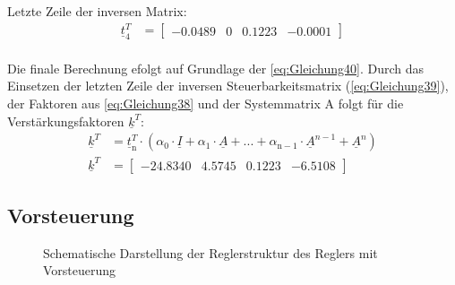 \documentclass[
	pagesize,
	fontsize=12pt,
	paper=a4,
	oneside,
   reqno
]{scrartcl}
\begin{document}
Letzte Zeile der inversen Matrix:
\begin{align} \label{eq:Gleichung39}
    \underline{t}_{\mathrm{4}}^T &=
    \begin{bmatrix}
        -0.0489 & 0 & 0.1223 & -0.0001
    \end{bmatrix}
\end{align}\\
Die finale Berechnung efolgt auf Grundlage der \autoref{eq:Gleichung40}. Durch das Einsetzen der letzten Zeile der inversen Steuerbarkeitsmatrix (\autoref{eq:Gleichung39}), der Faktoren aus \autoref{eq:Gleichung38} und der Systemmatrix A folgt für die Verstärkungsfaktoren $\underline{k}^T$:
\begin{align}
    \underline{k}^T &= \underline{t}_{\mathrm{n}}^T\cdot(\alpha_{\mathrm{0}}\cdot\underline{I} + \alpha_{\mathrm{1}}\cdot \underline{A} + ... + \alpha_{\mathrm{n-1}}\cdot \underline{A}^{n-1}+\underline{A}^n) \label{eq:Gleichung40}\\
    \underline{k}^T &=
    \begin{bmatrix}
        -24.8340 & 4.5745 & 0.1223 & -6.5108
    \end{bmatrix} \label{eq:Gleichung41}
\end{align}

\subsection{Vorsteuerung}

\begin{figure}[H]
    \centering
    \caption[Reglerstruktur Vorsteuerung]{Schematische Darstellung der Reglerstruktur des Reglers mit Vorsteuerung}
    \label{fig:Bild8}
\end{figure}
\end{document}
